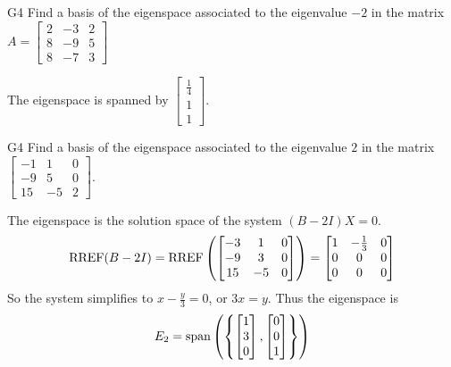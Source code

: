 \begin{problem}{G4}
Find a basis of the eigenspace associated to the eigenvalue $-2$ in the matrix $A=\begin{bmatrix}2 & -3 & 2 \\ 8 & -9 & 5 \\ 8 & -7 & 3\end{bmatrix}$
\end{problem}
\begin{solution}
The eigenspace is spanned by $\begin{bmatrix} \frac{1}{4} \\ 1 \\ 1 \end{bmatrix}$.
\end{solution}


\begin{problem}{G4}
Find a basis of the eigenspace associated to the eigenvalue $2$ in the matrix $\begin{bmatrix} -1 & 1 & 0 \\ -9 & 5 & 0 \\ 15 & -5 & 2 \end{bmatrix}$.
\end{problem}

\begin{solution}
The eigenspace is the solution space of the system $(B-2I)X=0$.
$$\operatorname{RREF}(B-2I)=\operatorname{RREF}\left(\begin{bmatrix} -3 & 1 & 0 \\ -9 & 3 & 0 \\ 15 & - 5 & 0 \end{bmatrix} \right) = \begin{bmatrix} 1 & -\frac{1}{3} & 0 \\ 0 & 0 & 0 \\ 0 & 0 & 0 \end{bmatrix}$$
So the system simplifies to $x-\frac{y}{3}=0$, or $3x=y$.  Thus the eigenspace is $$E_2 = {\rm span}\left( \left\{ \begin{bmatrix} 1 \\ 3 \\ 0 \end{bmatrix}, \begin{bmatrix} 0 \\ 0 \\ 1\end{bmatrix} \right\} \right)$$
\end{solution}

